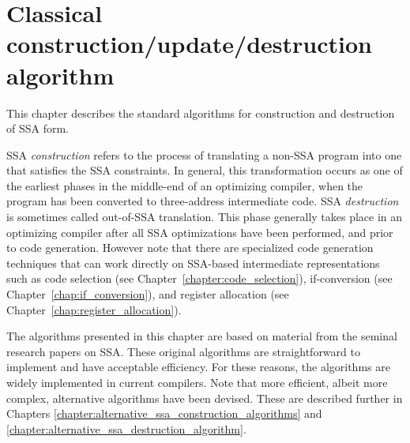 \chapter{Classical construction/update/destruction algorithm }
\label{chap:classical_construction}

\graphicspath{{Figures/}{classical_construction_algorithm/Figures/}{part1/classical_construction_algorithm/Figures/}}



\def\undef{\perp}
\def\DF{\mathrm{DF}}
\def\iDF{\mathrm{iDF}}
\def\join{\J}


This chapter describes the standard algorithms for construction and
destruction of SSA form.

SSA \emph{construction} refers to the process of translating a non-SSA program into
one that satisfies the SSA constraints. In general, this transformation
occurs as one of the
earliest phases in the middle-end of an optimizing compiler, when the program
has been converted to three-address intermediate code.
SSA \emph{destruction} is sometimes called out-of-SSA translation. This phase
generally
takes place in an optimizing compiler after all SSA optimizations have
been performed, and prior to code generation. However note that there are
specialized code generation techniques that can work directly on SSA-based
intermediate representations such as code selection (see
Chapter~\ref{chapter:code_selection}), if-conversion (see
Chapter~\ref{chap:if_conversion}),
and register allocation (see Chapter~\ref{chap:register_allocation}).

The algorithms presented in this chapter are
based on material from the seminal research papers on SSA.
These original algorithms are 
straightforward to implement and have acceptable efficiency.
For these reasons, the algorithms
are widely implemented in current compilers.
Note that more
efficient, albeit more complex, alternative algorithms have been devised.
These are described further in Chapters 
\ref{chapter:alternative_ssa_construction_algorithms}
and
\ref{chapter:alternative_ssa_destruction_algorithm}.


